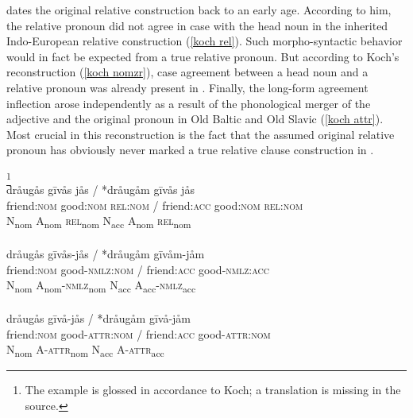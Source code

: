 \citet[468, 470]{koch1999} dates the original relative construction back to an early  age. According to him, the relative pronoun did not agree in case with the head noun in the inherited Indo-European relative construction (\ref{koch rel}). Such morpho-syntactic behavior would in fact be expected from a true relative pronoun. But according to Koch's reconstruction (\ref{koch nomzr}), case agreement between a head noun and a relative pronoun was already present in . Finally, the long-form agreement inflection arose independently as a result of the phonological merger of the adjective and the original pronoun in Old Baltic and Old Slavic (\ref{koch attr}). Most crucial in this reconstruction is the fact that the assumed original relative pronoun has obviously never marked a true relative clause construction in .
\begin{exe}
\ex
\label{koch rel}
\begin{xlist}
\footnote{The example is glossed in accordance to Koch; a translation is missing in the source.}\\
\glll	*dråugås gīvås jås {\upshape /} *dråugåm gīvås jås\\
	friend:\textsc{nom} good:\textsc{nom} \textsc{rel:nom} / friend:\textsc{acc} good:\textsc{nom} \textsc{rel:nom}\\
	N\textsubscript{nom} A\textsubscript{nom} \textsc{rel}\textsubscript{nom} { } N\textsubscript{acc} A\textsubscript{nom} \textsc{rel}\textsubscript{nom}\\
\\
\label{koch nomzr}
\glll	*dråugås gīvås-jås {\upshape /} *dråugåm gīvåm-jåm\\
	friend:\textsc{nom} good-\textsc{nmlz:nom} / friend:\textsc{acc} good-\textsc{nmlz:acc}\\
	N\textsubscript{nom} A\textsubscript{nom}-\textsc{nmlz}\textsubscript{nom} { } N\textsubscript{acc} A\textsubscript{acc}-\textsc{nmlz}\textsubscript{acc}\\
\\
\label{koch attr}
\glll	*dråugås gīvå-jås {\upshape /} *dråugåm gīvå-jåm\\
	friend:\textsc{nom} good-\textsc{attr:nom} / friend:\textsc{acc} good-\textsc{attr:nom}\\
	N\textsubscript{nom} A-\textsc{attr}\textsubscript{nom} { } N\textsubscript{acc} A-\textsc{attr}\textsubscript{acc}\\
\end{xlist}
\end{exe}

